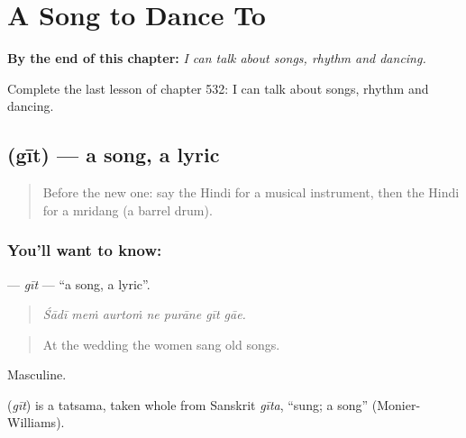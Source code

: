 
\chapter{A Song to Dance To}
\label{ch:hi-a-song-to-dance-to}

\begin{chapteropening}
\textbf{By the end of this chapter:} \emph{I can talk about songs, rhythm and dancing.}

Complete the last lesson of chapter 532: I can talk about songs, rhythm and dancing.
\end{chapteropening}

\section[\texorpdfstring{\hi{गीत} (gīt)}{गीत (gīt)}]{ (gīt) — a song, a lyric}

\label{lesson:HI-C532-git}



\begin{quote}
Before the new one: say the Hindi for a musical instrument, then the Hindi for a mridang (a barrel drum).
\end{quote}

\subsection*{You'll want to know: }
\textbf{} — \emph{gīt} — \textquotedblleft{}a song, a lyric\textquotedblright{}.

\begin{quote}
      
\end{quote}

\begin{quote}
\emph{Śādī meṁ aurtoṁ ne purāne gīt gāe.}
\end{quote}

\begin{quote}
At the wedding the women sang old songs.
\end{quote}

Masculine.

\begin{cousinweb}
\textbf{} (\emph{gīt}) is a tatsama, taken whole from Sanskrit \emph{gīta}, \textquotedblleft{}sung; a song\textquotedblright{} (Monier-Williams).
\end{cousinweb}

